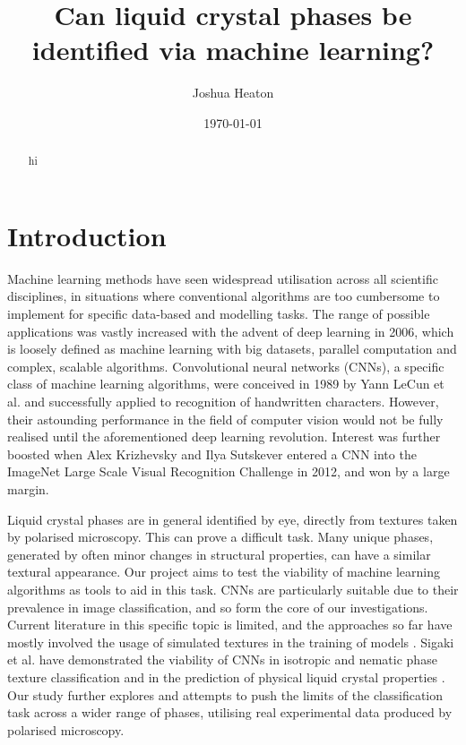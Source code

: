 \documentclass[12pt]{article}
\begin{document}
\title{Can liquid crystal phases be identified via machine learning?}
\author{Joshua Heaton}
\date{\today}

\maketitle

\begin{abstract}
hi
\end{abstract}

\newpage
{}

\section{Introduction}
Machine learning methods have seen widespread utilisation across all scientific disciplines, in situations where conventional algorithms are too cumbersome to implement for specific data-based and modelling tasks. The range of possible applications was vastly increased with the advent of deep learning in 2006, which is loosely defined as machine learning with big datasets, parallel computation and complex, scalable algorithms. Convolutional neural networks (CNNs), a specific class of machine learning algorithms, were conceived in 1989 by Yann LeCun et al. and successfully applied to recognition of handwritten characters. However, their astounding performance in the field of computer vision would not be fully realised until the aforementioned deep learning revolution. Interest was further boosted when Alex Krizhevsky and Ilya Sutskever entered a CNN into the ImageNet Large Scale Visual Recognition Challenge in 2012, and won by a large margin.

Liquid crystal phases are in general identified by eye, directly from textures taken by polarised microscopy. This can prove a difficult task. Many unique phases, generated by often minor changes in structural properties, can have a similar textural appearance. Our project aims to test the viability of machine learning algorithms as tools to aid in this task. CNNs are particularly suitable due to their prevalence in image classification, and so form the core of our investigations. Current literature in this specific topic is limited, and the approaches so far have mostly involved the usage of simulated textures in the training of models \cite{Sigaki20, Minor20}. Sigaki et al. have demonstrated the viability of CNNs in isotropic and nematic phase texture classification and in the prediction of physical liquid crystal properties \cite{Sigaki20}. Our study further explores and attempts to push the limits of the classification task across a wider range of phases, utilising real experimental data produced by polarised microscopy.
\end{document}
